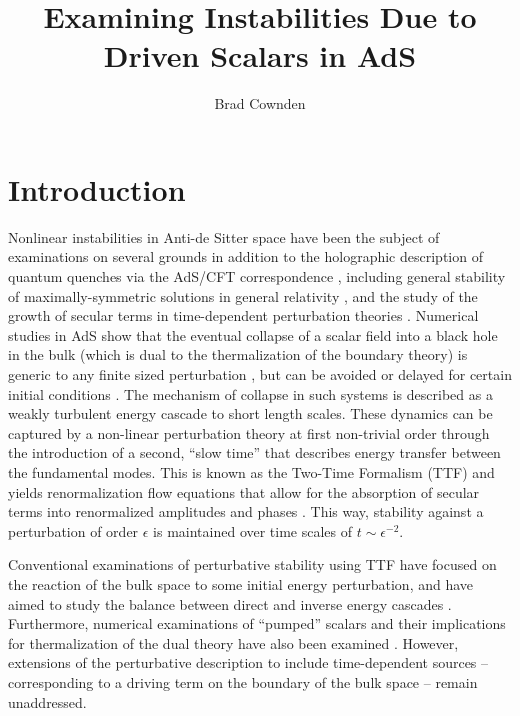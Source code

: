 \documentclass[letterpaper,11pt]{article}
\title{Examining Instabilities Due to Driven Scalars in AdS}
\author{Brad Cownden}
\affiliation{Department of Physics \& Astronomy\\ University of Manitoba,
Winnipeg, Manitoba R3T 2N2, Canada}
\begin{document}
\maketitle
\flushbottom
\newpage


\section{Introduction}

Nonlinear instabilities in Anti-de Sitter space have been the subject of examinations on several grounds in addition to  the holographic description of quantum quenches via the AdS/CFT correspondence \cite{ 1708.05600, 1501.00007}, including general stability of maximally-symmetric solutions in general relativity \cite{1104.3702, 1208.5772, 1706.06101}, and the study of the growth of secular terms in time-dependent perturbation theories \cite{hep-th/9506161, 1305.4117}. Numerical studies in AdS show that the eventual collapse of a scalar field into a black hole in the bulk (which is dual to the thermalization of the boundary theory) is generic to any finite sized perturbation \cite{1104.3702, 1106.2339, 1108.4539}, but can be avoided or delayed for certain initial conditions \cite{1803.02830, 1711.00454, 1706.07413, 1508.02709}. The mechanism of collapse in such systems is described as a weakly turbulent energy cascade to short length scales. These dynamics can be captured by a non-linear perturbation theory at first non-trivial order through the introduction of a second, ``slow time'' that describes energy transfer between the fundamental modes. This is known as the Two-Time Formalism (TTF) \cite{1403.6471} and yields renormalization flow equations that allow for the absorption of secular terms into renormalized amplitudes and phases \cite{1308.2132, 1508.05474, 1407.6273, 1412.3249, 1508.04943}. This way, stability against a perturbation of order $\epsilon$ is maintained over time scales of $t \sim \epsilon^{-2}$.

Conventional examinations of perturbative stability using TTF have focused on the reaction of the bulk space to some initial energy perturbation, and have aimed to study the balance between direct and inverse energy cascades \cite{1606.02712, 1612.04758, 1602.05859, 1507.08261, 1607.08094}. Furthermore, numerical examinations of ``pumped'' scalars and their implications for thermalization of the dual theory have also been examined \cite{1410.6201, 1712.07637, 1612.07701, 1502.05726, 1706.02438}. However, extensions of the perturbative description to include time-dependent sources -- corresponding to a driving term on the boundary of the bulk space -- remain unaddressed. 
\end{document}
